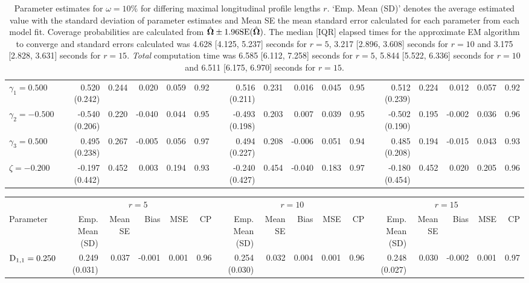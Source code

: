 \begin{landscape}
\begin{table}[ht]
\begin{tabular}{l|rrrrr:rrrrr:rrrrr}
  $\gamma_1= 0.500$ &  0.520 (0.242) & 0.244 &  0.020 & 0.059 & 0.92 &  0.516 (0.211) & 0.231 &  0.016 & 0.045 & 0.95 &  0.512 (0.239) & 0.224 &  0.012 & 0.057 & 0.92 \\ 
  $\gamma_2=-0.500$ & -0.540 (0.206) & 0.220 & -0.040 & 0.044 & 0.95 & -0.493 (0.198) & 0.203 &  0.007 & 0.039 & 0.95 & -0.502 (0.190) & 0.195 & -0.002 & 0.036 & 0.96 \\ 
  $\gamma_3= 0.500$ &  0.495 (0.238) & 0.267 & -0.005 & 0.056 & 0.97 &  0.494 (0.227) & 0.208 & -0.006 & 0.051 & 0.94 &  0.485 (0.208) & 0.194 & -0.015 & 0.043 & 0.93 \\ 
  $\zeta=-0.200$ & -0.197 (0.442) & 0.452 &  0.003 & 0.194 & 0.93 & -0.240 (0.427) & 0.454 & -0.040 & 0.183 & 0.97 & -0.180 (0.454) & 0.452 &  0.020 & 0.205 & 0.96 \\ 
   \hline
\end{tabular}
\endgroup
\caption{Parameter estimates for $\omega=10\%$ for differing maximal longitudinal profile lengths $r$. `Emp. Mean (SD)' denotes the average estimated value with the standard deviation of parameter estimates and Mean SE the mean standard error calculated for each parameter from each model fit. Coverage probabilities are calculated from $\hat{\bm{\Omega}}\pm1.96\mathrm{SE}(\hat{\bm{\Omega}})$. The median [IQR] elapsed times for the approximate EM algorithm to converge and standard errors calculated was 4.628 [4.125, 5.237] seconds for $r=5$, 3.217 [2.896, 3.608] seconds for $r=10$ and 3.175 [2.828, 3.631] seconds for $r=15$. \textit{Total} computation time was 6.585 [6.112, 7.258] seconds for $r=5$, 5.844 [5.522, 6.336] seconds for $r=10$ and 6.511 [6.175, 6.970] seconds for $r=15$.} 
\end{table}
\vfill
\lscapepageno
\clearpage
\thispagestyle{empty}
\vspace*{3.5em}
\begin{table}[ht]
\centering
{}
\captionsetup{font=scriptsize}
\begingroup\scriptsize
\begin{tabular}{l|rrrrr:rrrrr:rrrrr}
  &  &  & \\ 
  Parameter & Emp. Mean (SD) & Mean SE & Bias & MSE & CP & Emp. Mean (SD) & Mean SE & Bias & MSE & CP & Emp. Mean (SD) & Mean SE & Bias & MSE & CP \\ 
  \hline
  $\mathrm{D}_{1,1}= 0.250$ &  0.249 (0.031) & 0.037 & -0.001 & 0.001 & 0.96 &  0.254 (0.030) & 0.032 &  0.004 & 0.001 & 0.96 &  0.248 (0.027) & 0.030 & -0.002 & 0.001 & 0.97 \\ 

\end{tabular}
\end{table}
\end{landscape}
